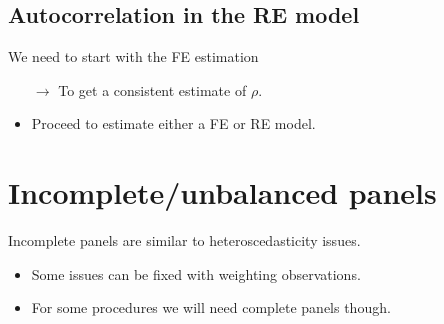 \begin{multicols}{2}
 \subsection{Autocorrelation in the RE model}
 We need to start with the FE estimation
 \begin{itemize}
  \item[$\rightarrow$] To get a consistent estimate of $\rho$.
  \item Proceed to estimate either a FE or RE model.
 \end{itemize}


\end{multicols}



\section{Incomplete/unbalanced panels} %
\begin{multicols}{2}
 Incomplete panels are similar to heteroscedasticity issues.
 \begin{itemize}
  \item Some issues can be fixed with weighting observations.
  \item For some procedures we will need complete panels though.
 \end{itemize}

\end{multicols}


